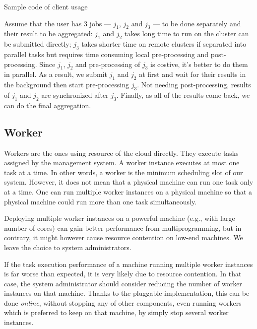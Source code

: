 \begin{Example Code}
  
  \caption{Sample code of client usage}
\end{Example Code}

Assume that the user has 3 jobs --- $j_1$, $j_2$ and $j_3$ --- to be
done separately and their result to be aggregated:  $j_1$ and $j_2$
takes long time to run on the cluster can be submitted directly; $j_3$
takes shorter time on remote clusters if separated into parallel tasks
but requires time consuming local pre-processing and post-processing.
Since $j_1$, $j_2$ and pre-processing of $j_3$ is costive, it's better
to do them in parallel.
As a result, we submit $j_1$ and $j_2$ at first and wait for their
results in the background then start pre-processing $j_3$. Not needing
post-processing, results of $j_1$ and $j_2$ are synchronized after
$j_3$.
Finally, as all of the results come back, we can do the final
aggregation.

\subsection{Worker}

Workers are the ones using resource of the cloud directly.
They execute tasks assigned by the management system.
A worker instance executes at most one task at a time.
In other words, a worker is the minimum scheduling slot of our system.
However, it does not mean that a physical machine can run one task only
at a time.
One can run multiple worker instances on a physical machine so that a
physical machine could run more than one task simultaneously.

Deploying multiple worker instances on a powerful machine (e.g., with
large number of cores) can gain better performance from
multiprogramming, but in contrary, it might however cause resource
contention on low-end machines.
We leave the choice to system administrators.

If the task execution performance of a machine running multiple worker
instances is far worse than expected, it is very likely due to resource
contention.
In that case, the system administrator should consider reducing the
number of worker instances on that machine.
Thanks to the pluggable implementation, this can be done \emph{online},
without stopping any of other components, even running workers which is
preferred to keep on that machine, by simply stop several worker
instances.

